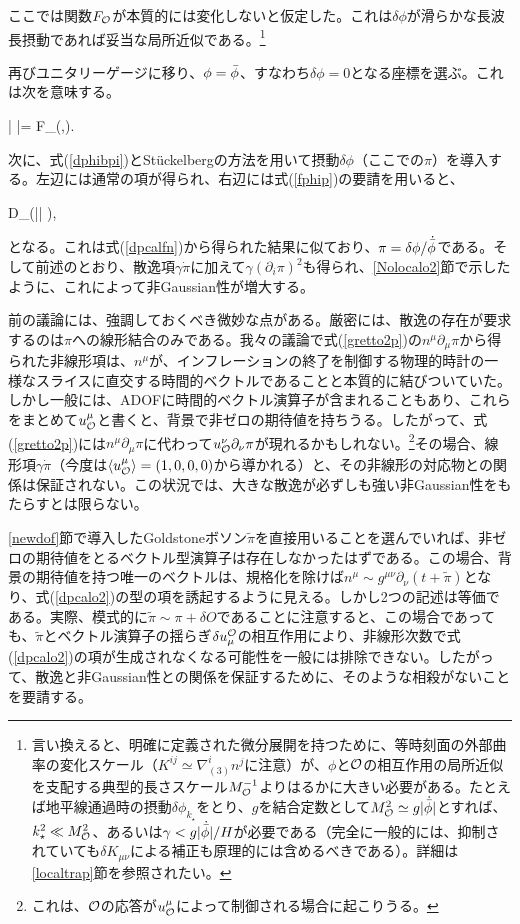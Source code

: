 ここでは関数$F_{\cal O}$が本質的には変化しないと仮定した。これは$\delta\phi$が滑らかな長波長摂動であれば妥当な局所近似である。\footnote{言い換えると、明確に定義された微分展開を持つために、等時刻面の外部曲率の変化スケール（$K^{ij}\simeq\nabla^i_{(3)}n^j$に注意）が、$\phi$と${\cal O}$の相互作用の局所近似を支配する典型的長さスケール$M_{\cal O}^{-1}$よりはるかに大きい必要がある。たとえば地平線通過時の摂動$\delta\phi_{k_\star}$をとり、$g$を結合定数として$M_{\cal O}^2\simeq g|\dot{{\bar\phi}}|$とすれば、$k_\star^2\ll M_{\cal O}^2$、あるいは$\gamma<g|\dot{{\bar\phi}}|/H$が必要である（完全に一般的には、抑制されていても$\delta K_{\mu\nu}$による補正も原理的には含めるべきである）。詳細は\ref{localtrap}節を参照されたい。}

再びユニタリーゲージに移り、$\phi={\bar\phi}$、すなわち$\delta\phi=0$となる座標を選ぶ。これは次を意味する。

\beq
\label{gcalo3}
\langle \phi| \calo |\phi \rangle = F_\calo\left(\bphi,\dot\bphi{}\right).
\eeq

次に、式(\ref{dphibpi})とSt\"uckelbergの方法を用いて摂動$\delta\phi$（ここでの$\pi$）を導入する。左辺には通常の項が得られ、右辺には式(\ref{fphip})の要請を用いると、

\beq
D_\phi \delta\phi  \simeq \delta \left(|\dot\bphi| \right),
\eeq

となる。これは式(\ref{dpcalfn})から得られた結果に似ており、$\pi=\delta\phi/\dot{{\bar\phi}}$である。そして前述のとおり、散逸項$\gamma\dot\pi$に加えて$\gamma(\partial_i\pi)^2$も得られ、\ref{Nolocalo2}節で示したように、これによって非Gaussian性が増大する。

前の議論には、強調しておくべき微妙な点がある。厳密には、散逸の存在が要求するのは$\pi$への線形結合のみである。我々の議論で式(\ref{gretto2p})の$n^\mu\partial_\mu\pi$から得られた非線形項は、$n^\mu$が、インフレーションの終了を制御する物理的時計の一様なスライスに直交する時間的ベクトルであることと本質的に結びついていた。しかし一般には、ADOFに時間的ベクトル演算子が含まれることもあり、これらをまとめて$u_{\cal O}^\mu$と書くと、背景で非ゼロの期待値を持ちうる。したがって、式(\ref{gretto2p})には$n^\mu\partial_\mu\pi$に代わって$u_{\cal O}^\nu\partial_\nu\pi$が現れるかもしれない。\footnote{これは、${\cal O}$の応答が$u_{\cal O}^\mu$によって制御される場合に起こりうる。}その場合、線形項$\gamma\dot\pi$（今度は$\langle u_{\cal O}^\mu\rangle=(1,0,0,0)$から導かれる）と、その非線形の対応物との関係は保証されない。この状況では、大きな散逸が必ずしも強い非Gaussian性をもたらすとは限らない。

\ref{newdof}節で導入したGoldstoneボソン$\tilde\pi$を直接用いることを選んでいれば、非ゼロの期待値をとるベクトル型演算子は存在しなかったはずである。この場合、背景の期待値を持つ唯一のベクトルは、規格化を除けば$n^\mu\sim g^{\mu\nu}\partial_\nu(t+\tilde\pi)$となり、式(\ref{dpcalo2})の型の項を誘起するように見える。しかし2つの記述は等価である。実際、模式的に$\tilde\pi\sim\pi+\delta O$であることに注意すると、この場合であっても、$\tilde\pi$とベクトル演算子の揺らぎ$\delta u_\mu^{\cal O}$の相互作用により、非線形次数で式(\ref{dpcalo2})の項が生成されなくなる可能性を一般には排除できない。したがって、散逸と非Gaussian性との関係を保証するために、そのような相殺がないことを要請する。


